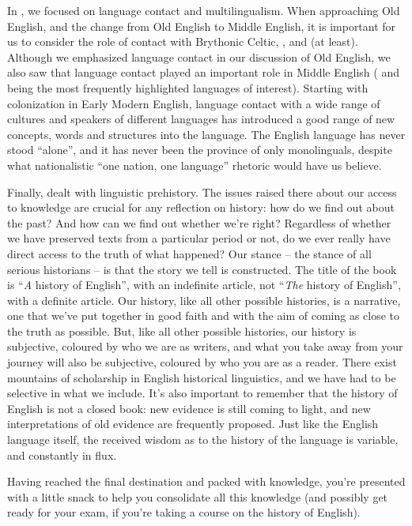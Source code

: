 In , we focused on language contact and multilingualism. When approaching Old English, and the change from Old English to Middle English, it is important for us to consider the role of contact with Brythonic Celtic, , and  (at least). Although we emphasized language contact in our discussion of Old English, we also saw that language contact played an important role in Middle English ( and  being the most frequently highlighted languages of interest). Starting with colonization in Early Modern English, language contact with a wide range of cultures and speakers of different languages has introduced a good range of new concepts, words and structures into the language. The English language has never stood ``alone'', and it has never been the province of only monolinguals, despite what nationalistic ``one nation, one language'' rhetoric would have us believe.

Finally,  dealt with linguistic prehistory. The issues raised there about our access to knowledge are crucial for any reflection on history: how do we find out about the past? And how can we find out whether we're right? Regardless of whether we have preserved texts from a particular period or not, do we ever really have direct access to the truth of what happened? Our stance -- the stance of all serious historians -- is that the story we tell is constructed. The title of the book is ``\emph{A} history of English'', with an indefinite article, not ``\emph{The} history of English'', with a definite article. Our history, like all other possible histories, is a narrative, one that we've put together in good faith and with the aim of coming as close to the truth as possible. But, like all other possible histories, our history is subjective, coloured by who we are as writers, and what you take away from your journey will also be subjective, coloured by who you are as a reader. There exist mountains of scholarship in English historical linguistics, and we have had to be selective in what we include. It's also important to remember that the history of English is not a closed book: new evidence is still coming to light, and new interpretations of old evidence are frequently proposed. Just like the English language itself, the received wisdom as to the history of the language is variable, and constantly in flux.

Having reached the final destination and packed with knowledge, you're presented with a little snack to help you consolidate all this knowledge (and possibly get ready for your exam, if you're taking a course on the history of English).

